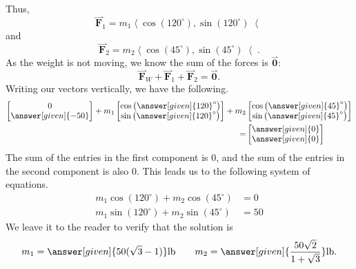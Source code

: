 \documentclass{ximera}
\begin{document}
\begin{example}
\begin{explanation}
\begin{image}
  \end{image}
    Thus,
    \[
    \overset{\rightharpoonup}{\mathbf{F}}_1 = m_1\left\langle \cos(120^\circ),\sin(120^\circ) \right\langle
    \]
    and
    \[
    \overset{\rightharpoonup}{\mathbf{F}}_2 = m_2\left\langle \cos(45^\circ),\sin(45^\circ) \right\langle.
    \]
    As the weight is not moving, we know the sum of the forces is
    $\overset{\rightharpoonup}{\mathbf{0}}$:
    \[
    \overset{\rightharpoonup}{\mathbf{F}}_W + \overset{\rightharpoonup}{\mathbf{F}}_1 + \overset{\rightharpoonup}{\mathbf{F}}_2 = \overset{\rightharpoonup}{\mathbf{0}}.
    \]
    Writing our vectors vertically, we have the following.
    \begin{align*}
      \begin{bmatrix}
        0\\
        \answer[given]{-50}
      \end{bmatrix}
      +m_1
      \begin{bmatrix}
        \cos\left({\answer[given]{120}}^\circ\right)\\
        \sin\left({\answer[given]{120}}^\circ\right)
      \end{bmatrix}
      + m_2
      &\begin{bmatrix}
      \cos\left({\answer[given]{45}}^\circ\right)\\
      \sin\left({\answer[given]{45}}^\circ\right)
      \end{bmatrix}\\
      =
      &\begin{bmatrix}
        \answer[given]{0}\\
        \answer[given]{0}
      \end{bmatrix}
    \end{align*}
    The sum of the entries in the first component is 0, and the sum of
    the entries in the second component is also 0. This leads us to
    the following system of equations.
    \begin{align*}
      m_1\cos(120^\circ) + m_2\cos(45^\circ) &=0 \\
      m_1\sin(120^\circ) + m_2\sin(45^\circ) &=50
    \end{align*}
    We leave it to the reader to verify that the solution is
    \[
    m_1=\answer[given]{50(\sqrt{3}-1)}\mathrm{lb} \qquad m_2=\answer[given]{\frac{50\sqrt{2}}{1+\sqrt{3}}}\mathrm{lb}.
    \]
  \end{explanation}
\end{example}
\end{document}
